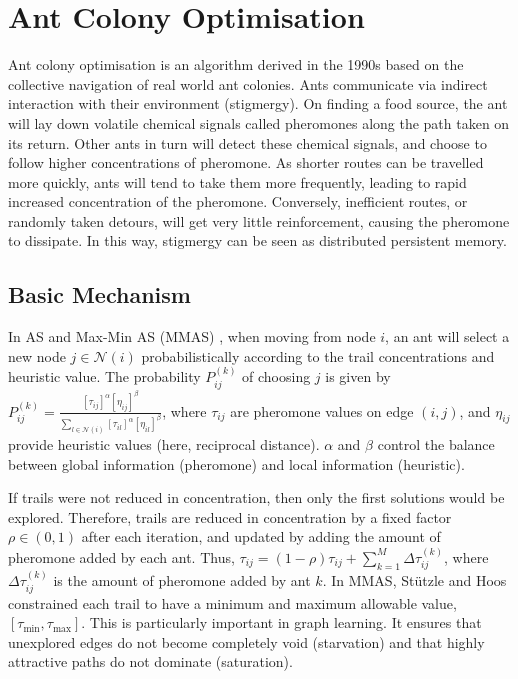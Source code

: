 \section[Ant Colony Optimisation]{\textbf{Ant Colony Optimisation}}
\label{sec:aco_background}

Ant colony optimisation is an algorithm derived in the 1990s \cite{dorigo1992optimization, dorigo1996ant} based on the collective navigation of real world ant colonies. Ants communicate via indirect interaction with their environment (stigmergy). On finding a food source, the ant will lay down volatile chemical signals called pheromones along the path taken on its return. Other ants in turn will detect these chemical signals, and choose to follow higher concentrations of pheromone. As shorter routes can be travelled more quickly, ants will tend to take them more frequently, leading to rapid increased concentration of the pheromone. Conversely, inefficient routes, or randomly taken detours, will get very little reinforcement, causing the pheromone to dissipate. In this way, stigmergy can be seen as distributed persistent memory.

\subsection{Basic Mechanism}
\label{sec:aco_basic_mechanism}
In AS \cite{dorigo1996ant} and Max-Min AS (MMAS) \cite{stutzle2000max}, when moving from node $i$, an ant will select a new node $j \in \mathcal{N}(i)$ probabilistically according to the trail concentrations and heuristic value. The probability $P_{ij}^{(k)}$ of choosing $j$ is given by $P_{ij}^{(k)} = \frac{[\tau_{ij}]^\alpha [\eta_{ij}]^\beta}{\sum_{l \in \mathcal{N}(i)} [\tau_{il}]^\alpha [\eta_{il}]^\beta}$, where $\tau_{ij}$ are pheromone values on edge $(i,j)$, and $\eta_{ij}$ provide heuristic values (here, reciprocal distance). $\alpha$ and $\beta$ control the balance between global information (pheromone) and local information (heuristic).

If trails were not reduced in concentration, then only the first solutions would be explored. Therefore, trails are reduced in concentration by a fixed factor $\rho \in (0,1)$ after each iteration, and updated by adding the amount of pheromone added by each ant. Thus, $\tau_{ij} = (1 - \rho)\tau_{ij} + \sum_{k=1}^M \Delta\tau_{ij}^{(k)}$, where $\Delta\tau_{ij}^{(k)}$ is the amount of pheromone added by ant $k$. In MMAS, St{\"u}tzle and Hoos constrained each trail to have a minimum and maximum allowable value, $[\tau_{\min}, \tau_{\max}]$. This is particularly important in graph learning. It ensures that unexplored edges do not become completely void (starvation) and that highly attractive paths do not dominate (saturation).

